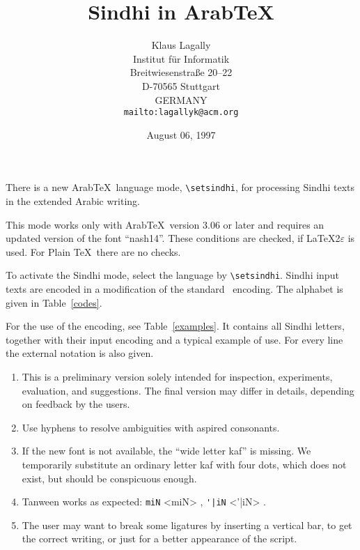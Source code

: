 \documentclass[12pt]{article}
\begin{document}
\title{Sindhi in Arab\TeX} 
\author
{Klaus Lagally\\
Institut f\"ur Informatik\\
Breitwiesenstra\ss e 20--22\\
D-70565 Stuttgart\\
GERMANY\\
\tt mailto:lagallyk@acm.org}
\date{August 06, 1997}

\maketitle

\setsindhi

There is a new Arab\TeX\ language mode, \verb+\setsindhi+,
for processing Sindhi texts in the extended Arabic writing.

This mode works only with Arab\TeX\ version 3.06 or later 
and requires an updated version of the font ``nash14''. 
These conditions are checked, if \LaTeX2$\varepsilon$ is used.
For Plain \TeX\ there are no checks.

To activate the Sindhi mode, select the language by \verb+\setsindhi+.
Sindhi input texts are encoded in a modification of the
standard \ArabTeX\ encoding.
The alphabet is given in Table~\ref {codes}.

For the use of the encoding, see Table~\ref {examples}.
It contains all Sindhi letters, 
together with their input encoding and a typical example of use.
For every line the external notation is also given.

\begin{enumerate}
\itemsep 0pt
\item 
This is a preliminary version solely
intended for inspection, experiments, evaluation, and suggestions.
The final version may differ in details, depending on feedback
by the users.

\item
Use hyphens to resolve ambiguities with aspired consonants.

\item 
If the new font is not available,
the ``wide letter kaf'' is missing.
We temporarily substitute an ordinary letter kaf with four dots,
which does not exist, but should be conspicuous enough.

\item
Tanween works as expected: \verb+miN+ <miN> , \verb+'|iN+ <'|iN> .

\item 
The user may want to break some ligatures by inserting a vertical bar,
to get the correct writing, or just for a better appearance of the script.

\end{enumerate}
\end{document}
